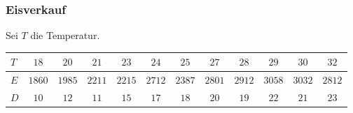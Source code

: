 \documentclass{beamer}
\begin{document}
\begin{frame}
\frametitle{Eisverkauf}

Sei $T$ die Temperatur.

\begin{tiny}
\begin{center}
\begin{tabular}{| l | c | c | c | c | c | c | c | c | c | c | c |}
\hline
$T$ & $18$ & $20$ & $21$ & $23$ & $24$ & $25$ & $27$ & $28$ & $29$ & $30$ & $32$\\
\hline
$E$ & $1860$ & $1985$ & $2211$ & $2215$ & $2712$ & $2387$ & $2801$ & $2912$ & $3058$ & $3032$ & $2812$\\
\hline
$D$ & $10$ & $12$ & $11$ & $15$ & $17$ & $18$ & $20$ & $19$ & $22$ & $21$ & $23$\\
\hline
\end{tabular}
\end{center}
\end{tiny}

\pause
\vspace*{-\baselineskip}


\end{frame}
\end{document}
